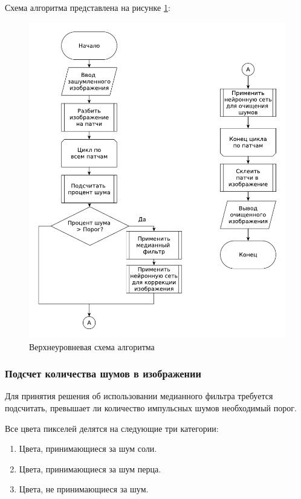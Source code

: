 Схема алгоритма представлена на рисунке \ref{contruct::mainAlgo}:
\FloatBarrier
\begin{figure}[h!]	
	\begin{center}
		\includegraphics[width=\linewidth]{inc/pdf/mainAlgo.pdf}
	\end{center}
	\captionsetup{justification=centering}
	\caption{Верхнеуровневая схема алгоритма}
	\label{contruct::mainAlgo}
\end{figure}
\FloatBarrier

\newpage
\subsubsection{Подсчет количества шумов в изображении}
Для принятия решения об использовании медианного фильтра требуется подсчитать, превышает ли количество импульсных шумов необходимый порог.

Все цвета пикселей делятся на следующие три категории:
\begin{enumerate}
	\item Цвета, принимающиеся за шум соли.
	\item Цвета, принимающиеся за шум перца.
	\item Цвета, не принимающиеся за шум.
\end{enumerate}

